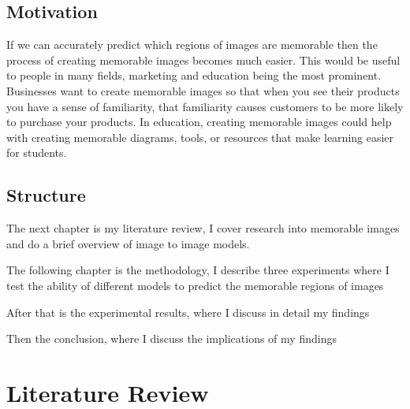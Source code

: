 \documentclass{UoYCSproject}
\begin{document}

\section{Motivation}


If we can accurately predict which regions of images are memorable then the process of creating memorable images becomes much easier. This would be useful to people in many fields, marketing and education being the most prominent. Businesses want to create memorable images so that when you see their products you have a sense of familiarity, that familiarity causes customers to be more likely to purchase your products.
In education, creating memorable images could help with creating memorable diagrams, tools, or resources that make learning easier for students. 




\section{Structure}


The next chapter is my literature review, I cover research into memorable images and do a brief overview of image to image models.

The following chapter is the methodology, I describe three experiments where I test the ability of different models to predict the memorable regions of images

After that is the experimental results, where I discuss in detail my findings

Then the conclusion, where I discuss the implications of my findings

\chapter{Literature Review}
\end{document}
